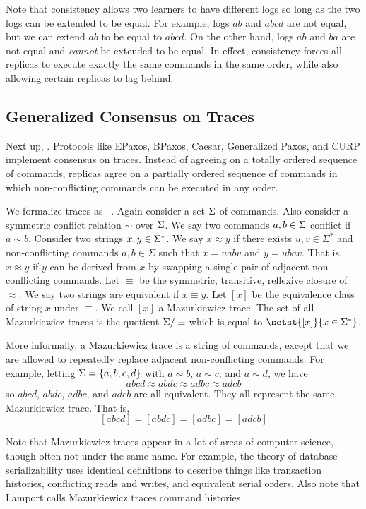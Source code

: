 Note that consistency allows two learners to have different logs so long as the
two logs can be extended to be equal. For example, logs $ab$ and $abcd$ are not
equal, but we can extend $ab$ to be equal to $abcd$. On the other hand, logs
$ab$ and $ba$ are not equal and \emph{cannot} be extended to be equal. In
effect, consistency forces all replicas to execute exactly the same commands in
the same order, while also allowing certain replicas to lag behind.

\subsection{Generalized Consensus on Traces}
\newcommand{\conflict}{\sim}
Next up, . Protocols like EPaxos,
BPaxos, Caesar, Generalized Paxos, and CURP implement consensus on traces.
Instead of agreeing on a totally ordered sequence of commands, replicas agree
on a partially ordered sequence of commands in which non-conflicting commands
can be executed in any order.

We formalize traces as ~\cite{mazurkiewicz1986trace}. Again consider a set $\Sigma$ of commands.
Also consider a symmetric conflict relation $\conflict$ over $\Sigma$. We say two
commands $a, b \in \Sigma$ conflict if $a \conflict b$. Consider two strings $x,
y \in \Sigma^*$. We say $x \approx y$ if there exists $u, v \in \Sigma^*$ and
non-conflicting commands $a, b \in \Sigma$ such that $x = uabv$ and $y=ubav$.
That is, $x \approx y$ if $y$ can be derived from $x$ by swapping a single pair
of adjacent non-conflicting commands. Let $\equiv$ be the symmetric,
transitive, reflexive closure of $\approx$. We say two strings are equivalent
if $x \equiv y$. Let $[x]$ be the equivalence class of string $x$ under
$\equiv$. We call $[x]$ a Mazurkiewicz trace. The set of all Mazurkiewicz
traces is the quotient $\Sigma/\equiv$ which is equal to $\setst{[x]}{x \in
\Sigma^*}$.

More informally, a Mazurkiewicz trace is a string of commands, except that we
are allowed to repeatedly replace adjacent non-conflicting commands. For
example, letting $\Sigma = \{a, b, c, d\}$ with $a \conflict b$, $a \conflict
c$, and $a \conflict d$, we have
\[
  abcd \approx abdc \approx adbc \approx adcb
\]
so $abcd$, $abdc$, $adbc$, and $adcb$ are all equivalent. They all represent
the same Mazurkiewicz trace. That is,
\[
  [abcd] = [abdc] = [adbc] = [adcb]
\]

Note that Mazurkiewicz traces appear in a lot of areas of computer science,
though often not under the same name. For example, the theory of database
serializability uses identical definitions to describe things like transaction
histories, conflicting reads and writes, and equivalent serial orders.  Also
note that Lamport calls Mazurkiewicz traces command
histories~\cite{lamport2005generalized}.

